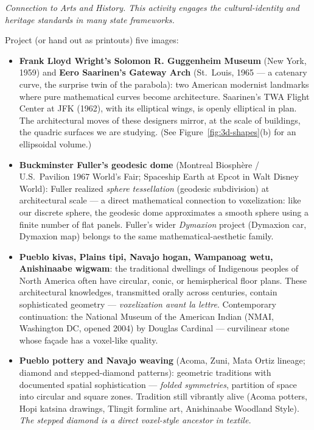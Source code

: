 \documentclass[12pt,a4paper]{scrartcl}
\newcommand{\acc}[1]{\textcolor{accent}{\textbf{#1}}}
\newcommand{\timetag}[1]{\textnormal{\footnotesize\color{bg!90!white}\textsf{#1}}}
\begin{document}
\begin{activity}[3.4 --- Dialogue with American visual heritage \quad\timetag{10 min}]\label{at:34}
\emph{Connection to Arts and History. This activity engages the cultural-identity and heritage standards in many state frameworks.}

Project (or hand out as printouts) five images:

\begin{itemize}[leftmargin=1.3em,itemsep=0.2em,topsep=0.3em,nosep]
  \item \acc{Frank Lloyd Wright's Solomon R. Guggenheim Museum} (New York, 1959) and \acc{Eero Saarinen's Gateway Arch} (St.\ Louis, 1965 --- a catenary curve, the surprise twin of the parabola): two American modernist landmarks where pure mathematical curves become architecture. Saarinen's TWA Flight Center at JFK (1962), with its elliptical wings, is openly elliptical in plan. The architectural moves of these designers mirror, at the scale of buildings, the quadric surfaces we are studying. (See Figure~\ref{fig:3d-shapes}(b) for an ellipsoidal volume.)

  \item \acc{Buckminster Fuller's geodesic dome} (Montreal Biosphère / U.S.\ Pavilion 1967 World's Fair; Spaceship Earth at Epcot in Walt Disney World): Fuller realized \emph{sphere tessellation} (geodesic subdivision) at architectural scale --- a direct mathematical connection to voxelization: like our discrete sphere, the geodesic dome approximates a smooth sphere using a finite number of flat panels. Fuller's wider \emph{Dymaxion} project (Dymaxion car, Dymaxion map) belongs to the same mathematical-aesthetic family.

  \item \acc{Pueblo kivas, Plains tipi, Navajo hogan, Wampanoag wetu, Anishinaabe wigwam}: the traditional dwellings of Indigenous peoples of North America often have circular, conic, or hemispherical floor plans. These architectural knowledges, transmitted orally across centuries, contain sophisticated geometry --- \emph{voxelization avant la lettre}. Contemporary continuation: the National Museum of the American Indian (NMAI, Washington DC, opened 2004) by Douglas Cardinal --- curvilinear stone whose façade has a voxel-like quality.

  \item \acc{Pueblo pottery and Navajo weaving} (Acoma, Zuni, Mata Ortiz lineage; diamond and stepped-diamond patterns): geometric traditions with documented spatial sophistication --- \emph{folded symmetries}, partition of space into circular and square zones. Tradition still vibrantly alive (Acoma potters, Hopi katsina drawings, Tlingit formline art, Anishinaabe Woodland Style). \emph{The stepped diamond is a direct voxel-style ancestor in textile.}


\end{itemize}
\end{activity}
\end{document}
